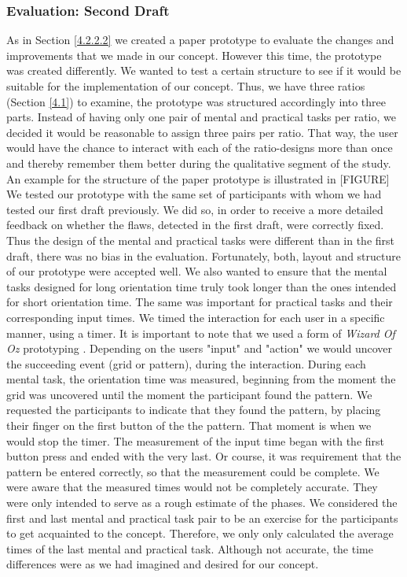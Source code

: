 \subsubsection{Evaluation: Second Draft}

As in Section \ref{4.2.2.2} we created a paper prototype to evaluate the changes and improvements that we made in our concept. However this time, the prototype was created differently. We wanted to test a certain structure to see if it would be suitable for the implementation of our concept. Thus, we have three ratios (Section \ref{4.1}) to examine, the prototype was structured accordingly into three parts. Instead of having only one pair of mental and practical tasks per ratio, we decided it would be reasonable to assign three pairs per ratio. That way, the user would have the chance to interact with each of the ratio-designs more than once and thereby remember them better during the qualitative segment of the study. An example for the structure of the paper prototype is illustrated in [FIGURE] \\

We tested our prototype with the same set of participants with whom we had tested our first draft previously. We did so, in order to receive a more detailed feedback on whether the flaws, detected in the first draft, were correctly fixed. Thus the design of the mental and practical tasks were different than in the first draft, there was no bias in the evaluation. Fortunately, both, layout and structure of our prototype were accepted well. We also wanted to ensure that the mental tasks designed for long orientation time truly took longer than the ones intended for short orientation time. The same was important for practical tasks and their corresponding input times. We timed the interaction for each user in a specific manner, using a timer. It is important to note that we used a form of \textit{Wizard Of Oz} prototyping \cite{Butz2014}. Depending on the users "input" and "action" we would uncover the succeeding event (grid or pattern), during the interaction. During each mental task, the orientation time was measured, beginning from the moment the grid was uncovered until the moment the participant found the pattern. We requested the participants to indicate that they found the pattern, by placing their finger on the first button of the the pattern. That moment is when we would stop the timer. The measurement of the input time began with the first button press and ended with the very last. Or course, it was requirement that the pattern be entered correctly, so that the measurement could be complete. We were aware that the measured times would not be completely accurate. They were only intended to serve as a rough estimate of the phases. We considered the first and last mental and practical task pair to be an exercise for the participants to get acquainted to the concept. Therefore, we only only calculated the average times of the last mental and practical task. Although not accurate, the time differences were as we had imagined and desired for our concept. 

